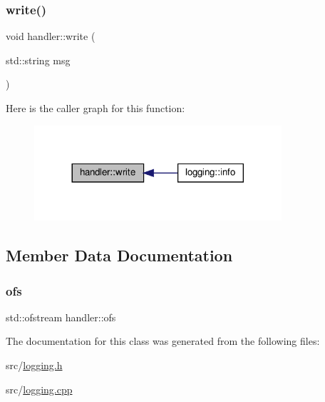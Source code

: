 \mbox{\label{classhandler_ae4a74a6e7ba909279833759b4cab2bcc}} 
\subsubsection{\texorpdfstring{write()}{write()}}
{\footnotesize\ttfamily void handler\+::write (\begin{DoxyParamCaption}\item[{std\+::string}]{msg }\end{DoxyParamCaption})\hspace{0.3cm}{\ttfamily [virtual]}}

Here is the caller graph for this function\+:\nopagebreak
\begin{figure}[H]
\begin{center}
\leavevmode
\includegraphics[width=260pt]{d1/df0/classhandler_ae4a74a6e7ba909279833759b4cab2bcc_icgraph}
\end{center}
\end{figure}


\subsection{Member Data Documentation}
\mbox{\label{classhandler_aea02e85ad5696302680d49a66263a2aa}} 
\subsubsection{\texorpdfstring{ofs}{ofs}}
{\footnotesize\ttfamily std\+::ofstream handler\+::ofs\hspace{0.3cm}{\ttfamily [protected]}}



The documentation for this class was generated from the following files\+:\begin{DoxyCompactItemize}
\item 
src/\hyperlink{logging_8h}{logging.\+h}\item 
src/\hyperlink{logging_8cpp}{logging.\+cpp}\end{DoxyCompactItemize}
